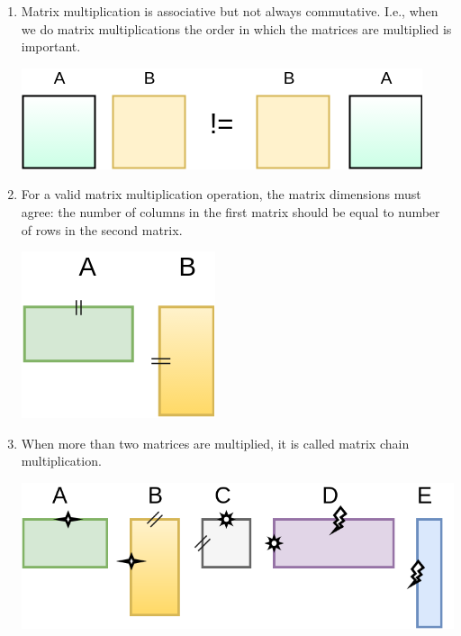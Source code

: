 \documentclass[10pts]{article}
\begin{document}
\begin{enumerate}[(\roman{*})] 
	\item Matrix multiplication is associative but not always commutative. I.e., when we do matrix multiplications the order in which the matrices are multiplied is important.\\
		\begin{center}
	\includegraphics[scale =0.3]{square_mat_commutation.png}\\
	   \end{center}
	\item For a valid matrix multiplication operation, the matrix dimensions must agree: the number of columns in the first matrix should be equal to number of rows in the second matrix. \\
		\begin{center}
	\includegraphics[scale =0.3]{matrix_commutation.png}\\
	    \end{center}
	\item When more than two matrices are multiplied, it is called  matrix chain multiplication. \\ 
		\begin{center}
		\includegraphics[scale =0.2]{chain_matrix.png}
	\end{center}
\end{enumerate} 
\end{document}
